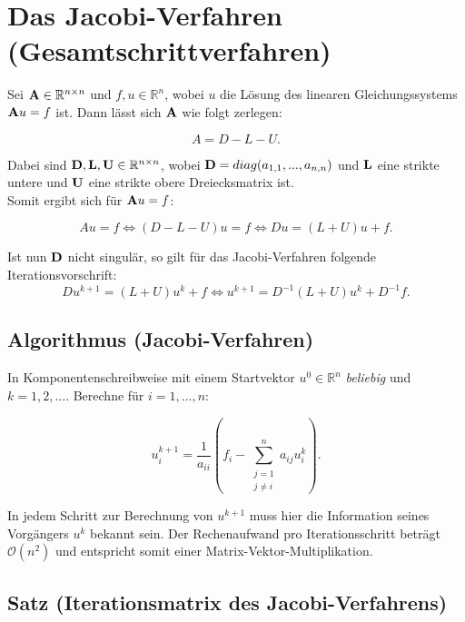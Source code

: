 \section{Das Jacobi-Verfahren (Gesamtschrittverfahren)}\label{s.Das Jacobi-Iterationsverfahren}

Sei ${\textbf{A}} \in \mathbb{R}^{n \times n}$ und $f,u \in \mathbb{R}^{n}$, wobei $u$ die Lösung des linearen Gleichungssystems ${\textbf{A}}u = f$ ist. Dann lässt sich ${\textbf{A}}$ wie folgt zerlegen:

\begin{equation}
A = D - L - U.
\end{equation}

Dabei sind ${\textbf{D}},{\textbf{L}},{\textbf{U}} \in \mathbb{R}^{n \times n}$, wobei ${\textbf{D}} = diag(a_{1,1},...,a_{n,n})$ und ${\textbf{L}}$ eine strikte untere und ${\textbf{U}}$ eine strikte obere Dreiecksmatrix ist. \\
Somit ergibt sich für ${\textbf{A}}u = f$:

\begin{equation}
Au = f \Leftrightarrow (D-L-U)u = f \Leftrightarrow Du = (L+U)u + f.
\end{equation}

Ist nun ${\textbf{D}}$ nicht singulär, so gilt für das Jacobi-Verfahren folgende Iterationsvorschrift:
\begin{equation}
Du^{k+1} = (L+U)u^{k} + f \Leftrightarrow u^{k+1} = D^{-1}(L+U)u^{k} + D^{-1}f.
\end{equation}

\subsection{Algorithmus (Jacobi-Verfahren)}\label{ss.Allgemeines Jacobi-Verfahren}
In Komponentenschreibweise mit einem Startvektor $u^{0} \in \mathbb{R}^{n}$ \textit{beliebig} und $k=1,2,...$. Berechne für $i=1,...,n$:

\begin{equation}
u^{k+1}_{i} = \frac {1} {a_{ii}} (f_{i} - \sum_{\substack{j = 1 \\ j \ne i}}^{n} a_{ij}u^{k}_{i}).
\end{equation}

In jedem Schritt zur Berechnung von $u^{k+1}$ muss hier die Information seines Vorgängers $u^{k}$ bekannt sein. Der Rechenaufwand pro Iterationsschritt beträgt $\mathcal{O}(n^{2})$ und entspricht somit einer Matrix-Vektor-Multiplikation.

\subsection{Satz (Iterationsmatrix des Jacobi-Verfahrens)}\label{ss.Iterationsmatrix Jacobi}

